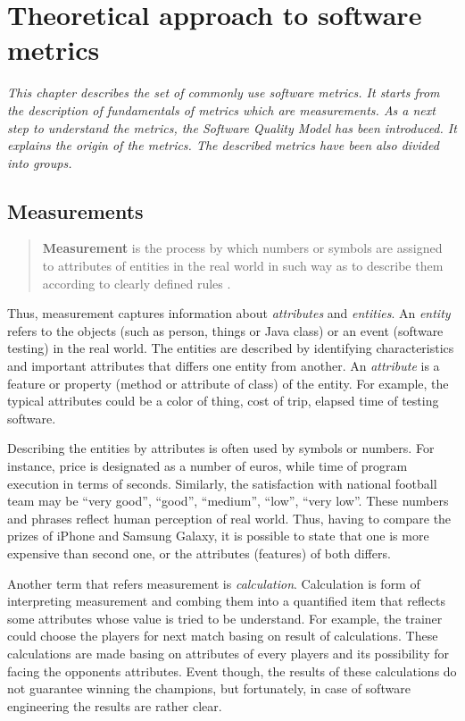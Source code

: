 \chapter{Theoretical approach to software metrics} \label{roz:metrics_theory}

\textit{This chapter describes the set of commonly use software metrics. It starts from the description of fundamentals of metrics which are measurements. As a next step to understand the metrics, the Software Quality Model has been introduced. It explains the origin of the metrics. The described metrics have been also divided into groups.} 

\section{Measurements}

\begin{quote}
\textbf{Measurement} is the process by which numbers or symbols are assigned to attributes of entities in the real world in such way as to describe them according to clearly defined rules \cite{rigorous}.
\end{quote}

Thus, measurement captures information about \textit{attributes} and \textit{entities}. An \textit{entity} refers to the objects (such as person, things or Java class) or an event (software testing) in the real world. The entities are described by identifying characteristics and important attributes that differs one entity from another. An \textit{attribute} is a feature or property (method or attribute of class) of the entity. For example, the typical attributes could be a color of thing, cost of trip, elapsed time of testing software.  

Describing the entities by attributes is often used by symbols or numbers. For instance, price is designated as a number of euros, while time of program execution in terms of seconds. Similarly, the satisfaction with national football team  may be ``very good'', ``good'', ``medium'', ``low'', ``very low''. These numbers and phrases reflect human perception of real world. Thus, having to compare the prizes of iPhone and Samsung Galaxy, it is possible to state that one is more expensive than second one, or the attributes (features) of both differs. 

Another term that refers measurement is \textit{calculation}. Calculation is form of interpreting measurement and combing them into a quantified item that reflects some attributes whose value is tried to be understand. For example, the trainer could choose the players for next match basing on result of calculations. These calculations are made basing on attributes of every players and its possibility for facing the opponents attributes. Event though, the results of these calculations do not guarantee winning the champions, but fortunately, in case of software engineering the results are rather clear.   

